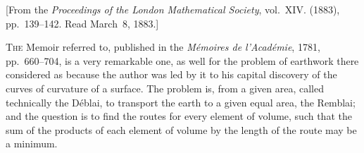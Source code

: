 \documentclass[11pt,a4paper]{book}
\begin{document}
\begin{center}
[From the \textit{Proceedings of the London Mathematical Society}, vol.~XIV. (1883), pp.~139--142. Read March~8, 1883.]
\end{center}

\textsc{The} Memoir referred to, published in the \textit{M\'{e}moires de l'Acad\'{e}mie}, 1781, pp.~660--704, is a very remarkable one, as well for the problem of earthwork there considered as because the author was led by it to his capital discovery of the curves of curvature of a surface. The problem is, from a given area, called technically the D\'{e}blai, to transport the earth to a given equal area, the Remblai; and the question is to find the routes for every element of volume, such that the sum of the products of each element of volume by the length of the route may be a minimum.
\end{document}
